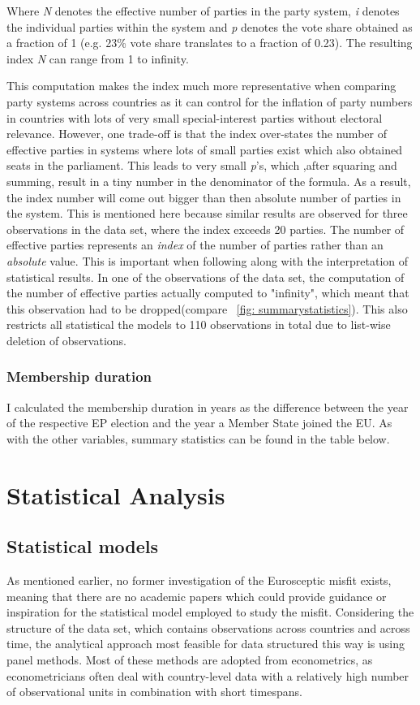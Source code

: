 Where \emph{N} denotes the effective number of parties in the party system, \emph{i} denotes the individual parties within the system and \emph{p} denotes the vote share obtained as a fraction of 1 (e.g. 23\% vote share translates to a fraction of 0.23). The resulting index \emph{N} can range from 1 to infinity.

This computation makes the index much more representative when comparing party systems across countries as it can control for the inflation of party numbers in countries with lots of very small special-interest parties without electoral relevance. However, one trade-off is that the index over-states the number of effective parties in systems where lots of small parties exist which also obtained seats in the parliament. This leads to very small \emph{p}'s, which ,after squaring and summing, result in a tiny number in the denominator of the formula. As a result, the index number will come out bigger than then absolute number of parties in the system. This is mentioned here because similar results are observed for three observations in the data set, where the index exceeds 20 parties. The number of effective parties represents an \emph{index} of the number of parties rather than an \emph{absolute} value. This is important when following along with the interpretation of statistical results. In one of the observations of the data set, the computation of the number of effective parties actually computed to "infinity", which meant that this observation had to be dropped(compare ~\ref{fig: summarystatistics}). This also restricts all statistical the models to 110 observations in total due to list-wise deletion of observations. 

\subsection{Membership duration}
I calculated the membership duration in years as the difference between the year of the respective EP election and the year a Member State joined the EU.
As with the other variables, summary statistics can be found in the table below. 



\chapter{Statistical Analysis}

\section{Statistical models}
As mentioned earlier, no former investigation of the Eurosceptic misfit exists, meaning that there are no academic papers which could provide guidance or inspiration for the statistical model employed to study the misfit.
Considering the structure of the data set, which contains observations across countries and across time, the analytical approach most feasible for data structured this way is using panel methods. Most of these methods are adopted from econometrics, as econometricians often deal with country-level data with a relatively high number of observational units in combination with short timespans.

